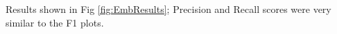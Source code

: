 \documentclass{sig-alternate-05-2015}
\begin{document}
Results shown in Fig \ref{fig:EmbResults}; Precision and Recall scores were very similar to the F1 plots. 


%
\end{document}
